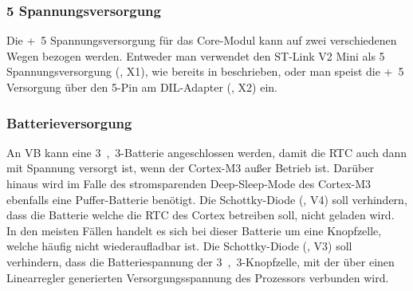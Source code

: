 \subsubsection{\unit{5}{\volt} Spannungsversorgung}
Die \unit{+5}{\volt} Spannungsversorgung für das \gls{Core-Modul} kann auf zwei verschiedenen Wegen bezogen werden. Entweder man verwendet den ST-Link V2 Mini als \unit{5}{\volt} Spannungsversorgung (, X1), wie bereits in  beschrieben, oder man speist die \unit{+5}{\volt} Versorgung über den \unit{5}{\volt}-Pin am DIL-Adapter (, X2) ein.


\subsubsection{Batterieversorgung}
An VB kann eine \unit{3,3}{\volt}-Batterie angeschlossen werden, damit die \gls{RTC} auch dann mit Spannung versorgt ist, wenn der Cortex-M3 außer Betrieb ist. Darüber hinaus wird im Falle des stromsparenden Deep-Sleep-Mode des Cortex-M3 ebenfalls eine Puffer-Batterie benötigt. Die Schottky-Diode (, V4) soll verhindern, dass die Batterie welche die \gls{RTC} des Cortex betreiben soll, nicht geladen wird. In den meisten Fällen handelt es sich bei dieser Batterie um eine Knopfzelle, welche häufig nicht wiederaufladbar ist. Die Schottky-Diode (, V3) soll verhindern, dass die Batteriespannung der \unit{3,3}{\volt}-Knopfzelle, mit der über einen Linearregler generierten Versorgungsspannung des Prozessors verbunden wird.


